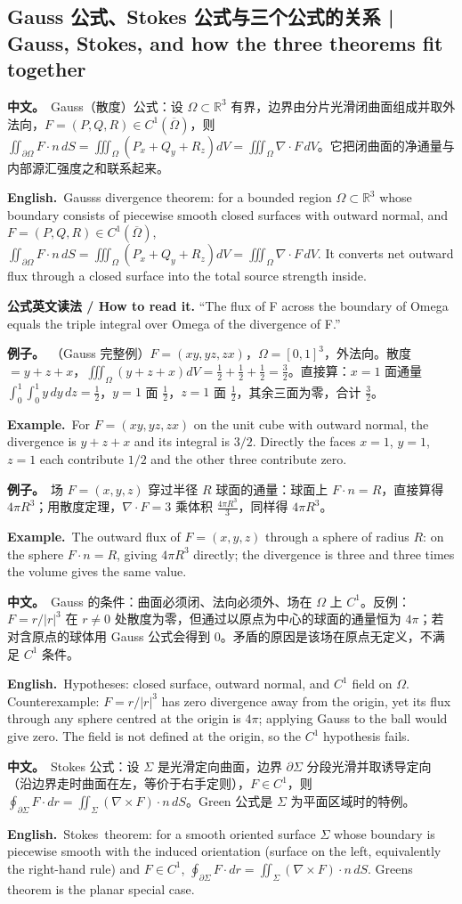 \documentclass[UTF8,11pt,a4paper]{ctexart}
\newcommand{\BOTH}[2]{\par\noindent\textbf{中文。}\ #1\par\noindent\textbf{English.}\ #2\par}
\newcommand{\EX}[2]{\par\noindent\textbf{例子。}\ #1\par\noindent\textbf{Example.}\ #2\par}
\newcommand{\READ}[1]{\par\noindent\textbf{公式英文读法 / How to read it.} #1\par}
\begin{document}
\subsection{Gauss 公式、Stokes 公式与三个公式的关系 | Gauss, Stokes, and how the three theorems fit together}
\BOTH{Gauss（散度）公式：设 $\Omega\subset\mathbb R^3$ 有界，边界由分片光滑闭曲面组成并取外法向，$F=(P,Q,R)\in C^1(\overline\Omega)$，则 $\iint_{\partial\Omega}F\cdot n\,dS=\iiint_\Omega(P_x+Q_y+R_z)dV=\iiint_\Omega\nabla\cdot F\,dV$。它把闭曲面的净通量与内部源汇强度之和联系起来。}{Gauss\textquotesingle s divergence theorem: for a bounded region $\Omega\subset\mathbb R^3$ whose boundary consists of piecewise smooth closed surfaces with outward normal, and $F=(P,Q,R)\in C^1(\overline\Omega)$, $\iint_{\partial\Omega}F\cdot n\,dS=\iiint_\Omega(P_x+Q_y+R_z)dV=\iiint_\Omega\nabla\cdot F\,dV$. It converts net outward flux through a closed surface into the total source strength inside.}
\READ{“The flux of F across the boundary of Omega equals the triple integral over Omega of the divergence of F.”}
\EX{（Gauss 完整例）$F=(xy,yz,zx)$，$\Omega=[0,1]^3$，外法向。散度 $=y+z+x$，$\iiint_\Omega(y+z+x)dV=\frac12+\frac12+\frac12=\frac32$。直接算：$x=1$ 面通量 $\int_0^1\int_0^1y\,dy\,dz=\frac12$，$y=1$ 面 $\frac12$，$z=1$ 面 $\frac12$，其余三面为零，合计 $\frac32$。}{For $F=(xy,yz,zx)$ on the unit cube with outward normal, the divergence is $y+z+x$ and its integral is $3/2$. Directly the faces $x=1$, $y=1$, $z=1$ each contribute $1/2$ and the other three contribute zero.}
\EX{场 $F=(x,y,z)$ 穿过半径 $R$ 球面的通量：球面上 $F\cdot n=R$，直接算得 $4\pi R^3$；用散度定理，$\nabla\cdot F=3$ 乘体积 $\frac{4\pi R^3}{3}$，同样得 $4\pi R^3$。}{The outward flux of $F=(x,y,z)$ through a sphere of radius $R$: on the sphere $F\cdot n=R$, giving $4\pi R^3$ directly; the divergence is three and three times the volume gives the same value.}
\BOTH{Gauss 的条件：曲面必须闭、法向必须外、场在 $\Omega$ 上 $C^1$。反例：$F=r/|r|^3$ 在 $r\ne0$ 处散度为零，但通过以原点为中心的球面的通量恒为 $4\pi$；若对含原点的球体用 Gauss 公式会得到 $0$。矛盾的原因是该场在原点无定义，不满足 $C^1$ 条件。}{Hypotheses: closed surface, outward normal, and $C^1$ field on $\Omega$. Counterexample: $F=r/|r|^3$ has zero divergence away from the origin, yet its flux through any sphere centred at the origin is $4\pi$; applying Gauss to the ball would give zero. The field is not defined at the origin, so the $C^1$ hypothesis fails.}
\BOTH{Stokes 公式：设 $\Sigma$ 是光滑定向曲面，边界 $\partial\Sigma$ 分段光滑并取诱导定向（沿边界走时曲面在左，等价于右手定则），$F\in C^1$，则 $\oint_{\partial\Sigma}F\cdot dr=\iint_\Sigma(\nabla\times F)\cdot n\,dS$。Green 公式是 $\Sigma$ 为平面区域时的特例。}{Stokes\textquotesingle\ theorem: for a smooth oriented surface $\Sigma$ whose boundary is piecewise smooth with the induced orientation (surface on the left, equivalently the right-hand rule) and $F\in C^1$, $\oint_{\partial\Sigma}F\cdot dr=\iint_\Sigma(\nabla\times F)\cdot n\,dS$. Green\textquotesingle s theorem is the planar special case.}
\end{document}

